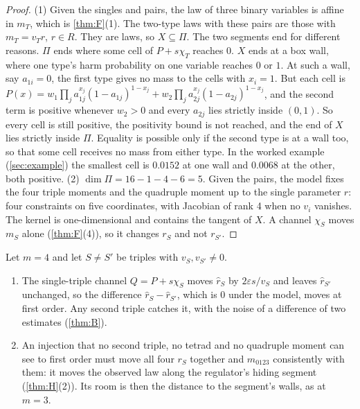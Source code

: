 \documentclass[11pt]{article}
\theoremstyle{definition}\newtheorem{definition}{Definition}\newtheorem{remark}{Remark}
\begin{document}
\begin{proof}
(1) Given the singles and pairs, the law of three binary variables is affine in $m_T$, which is \cref{thm:F}(1). The two-type laws with
these pairs are those with $m_T=v_Tr$, $r\in R$. They are laws, so $X\subseteq\Pi$. The two segments end for different reasons. $\Pi$ ends
where some cell of $P+s\chi_T$ reaches $0$. $X$ ends at a box wall, where one type's harm probability on one variable reaches $0$ or $1$.
At such a wall, say $a_{1i}=0$, the first type gives no mass to the cells with $x_i=1$. But each cell is
$P(x)=w_1\prod_j a_{1j}^{x_j}(1-a_{1j})^{1-x_j}+w_2\prod_j a_{2j}^{x_j}(1-a_{2j})^{1-x_j}$, and the second term is positive whenever
$w_2>0$ and every $a_{2j}$ lies strictly inside $(0,1)$. So every cell is still positive, the positivity bound is not reached, and the
end of $X$ lies strictly inside $\Pi$. Equality is possible only if the second type is at a wall too, so that some cell receives no mass
from either type. In the worked example (\cref{sec:example}) the smallest cell is $0.0152$ at one wall and $0.0068$ at the other, both positive. (2) $\dim\Pi=16-1-4-6=5$. Given the pairs, the model fixes the four triple moments and the quadruple moment up to the single
parameter $r$: four constraints on five coordinates, with Jacobian of rank 4 when no $v_i$ vanishes. The kernel is one-dimensional and
contains the tangent of $X$. A channel $\chi_S$ moves $m_S$ alone (\cref{thm:F}(4)), so it changes $r_S$ and not $r_{S'}$.
\end{proof}

\begin{corollary}\label{cor:secondtriple}
Let $m=4$ and let $S\neq S'$ be triples with $v_S,v_{S'}\neq0$.
\begin{enumerate}
\item[(a)] The single-triple channel $Q=P+s\chi_S$ moves $\hat r_S$ by $2\varepsilon s/v_S$ and leaves $\hat r_{S'}$ unchanged, so the
  difference $\hat r_S-\hat r_{S'}$, which is $0$ under the model, moves at first order. Any second triple catches it, with the noise
  of a difference of two estimates (\cref{thm:B}).
\item[(b)] An injection that no second triple, no tetrad and no quadruple moment can see to first order must move all four $r_S$
  together and $m_{0123}$ consistently with them: it moves the observed law along the regulator's hiding segment (\cref{thm:H}(2)). Its
  room is then the distance to the segment's walls, as at $m=3$.
\end{enumerate}
\end{corollary}
\end{document}
